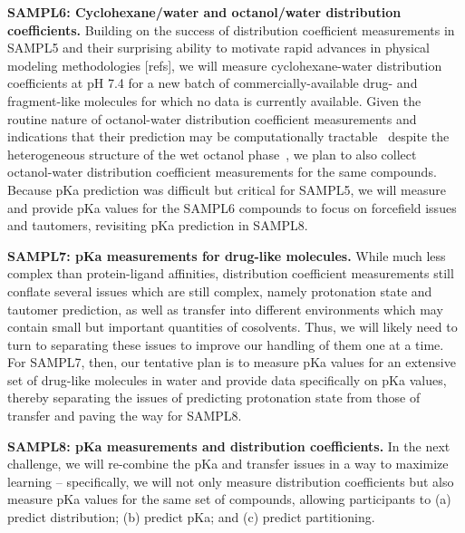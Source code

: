 \documentclass[11pt]{article}
\begin{document}
{\bf SAMPL6: Cyclohexane/water and octanol/water distribution coefficients.}
Building on the success of distribution coefficient measurements in SAMPL5 and their surprising ability to motivate rapid advances in physical modeling methodologies [refs], we will measure cyclohexane-water distribution coefficients at pH 7.4 for a new batch of commercially-available drug- and fragment-like molecules for which no data is currently available.
Given the routine nature of octanol-water distribution coefficient measurements and indications that their prediction may be computationally tractable~\cite{Bhatnagar:2013:PhysicalChemistryChemicalPhysics, bannan_calculating_2016} despite the heterogeneous structure of the wet octanol phase~\cite{Kollman:1996:AccountsofChemicalResearch}, we plan to also collect octanol-water distribution coefficient measurements for the same compounds.
Because pKa prediction was difficult but critical for SAMPL5, we will measure and provide pKa values for the SAMPL6 compounds to focus on forcefield issues and tautomers, revisiting pKa prediction in SAMPL8.

{\bf SAMPL7: pKa measurements for drug-like molecules.} 
While much less complex than protein-ligand affinities, distribution coefficient measurements still conflate several issues which are still complex, namely protonation state and tautomer prediction, as well as transfer into different environments which may contain small but important quantities of cosolvents. 
Thus, we will likely need to turn to separating these issues to improve our handling of them one at a time. 
For SAMPL7, then, our tentative plan is to measure pKa values for an extensive set of drug-like molecules in water and provide data specifically on pKa values, thereby separating the issues of predicting protonation state from those of transfer and paving the way for SAMPL8.

{\bf SAMPL8: pKa measurements and distribution coefficients.}
In the next challenge, we will re-combine the pKa and transfer issues in a way to maximize learning -- specifically, we will not only measure distribution coefficients but also measure pKa values for the same set of compounds, allowing participants to (a) predict distribution; (b) predict pKa; and (c) predict partitioning.
\end{document}
